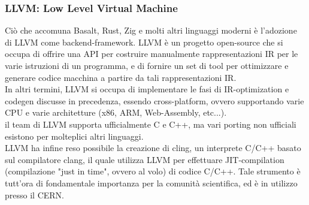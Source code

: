 \subsubsection{LLVM: Low Level Virtual Machine}
Ciò che accomuna Basalt, Rust, Zig e molti altri linguaggi moderni è l'adozione di LLVM 
come backend-framework. LLVM è un progetto open-source che si occupa di offrire una API 
per costruire manualmente rappresentazioni IR per le varie istruzioni di un programma, 
e di fornire un set di tool per ottimizzare e generare codice macchina a partire
da tali rappresentazioni IR. \\ 

In altri termini, LLVM si occupa di implementare le fasi di IR-optimization e 
codegen discusse in precedenza, essendo cross-platform, ovvero supportando 
varie CPU e varie architetture (x86, ARM, Web-Assembly, etc...). \\

il team di LLVM supporta ufficialmente C e C++, ma vari porting non ufficiali
esistono per molteplici altri linguaggi. \\

LLVM ha infine reso possibile la creazione di cling, un interprete C/C++ basato 
sul compilatore clang, il quale utilizza LLVM per effettuare JIT-compilation 
(compilazione "just in time", ovvero al volo) di codice C/C++. Tale 
strumento è tutt'ora di fondamentale importanza per la comunità scientifica, 
ed è in utilizzo presso il CERN.